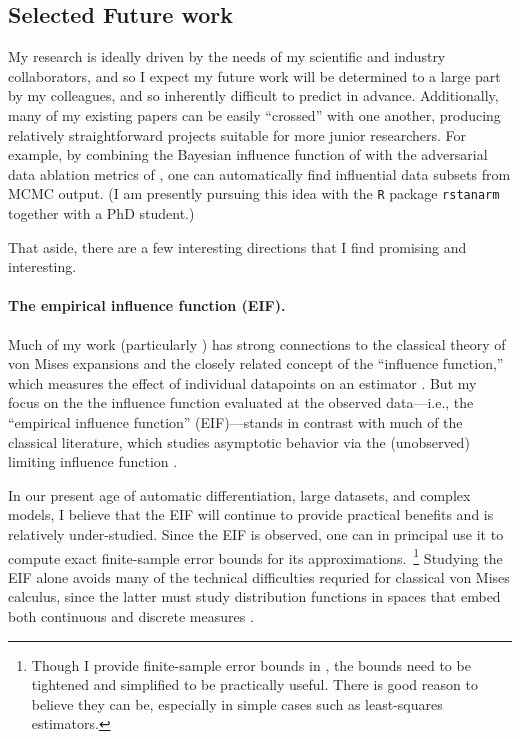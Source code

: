 
\clearpage
\subsection*{Selected Future work}

My research is ideally driven by the needs of my scientific and industry
collaborators, and so I expect my future work will be determined to a large part
by my colleagues, and so inherently difficult to predict in advance.
Additionally, many of my existing papers can be easily ``crossed'' with one
another, producing relatively straightforward projects suitable for more junior
researchers.  For example, by combining the Bayesian influence function of
\citet{giordano:2021:bayesij} with the adversarial data ablation metrics of
\citet{giordano:2020:amip}, one can automatically find influential data subsets
from MCMC output.  (I am presently pursuing this idea with the \texttt{R}
package \texttt{rstanarm} together with a PhD student.)

That aside, there are a few interesting directions that I find promising
and interesting.


\paragraph{The empirical influence function (EIF).}

Much of my work (particularly \citet{giordano:2019:ij, giordano:2020:amip,
giordano:2021:bayesij}) has strong connections to the classical theory of von
Mises expansions and the closely related concept of the ``influence function,''
which measures the effect of individual datapoints on an estimator
\citep{mises:1947:asymptotic, reeds:1976:thesis, hampel:1986:robustbook,
serfling:2009:approximation}.  But my focus on the the influence function
evaluated at the observed data---i.e., the ``empirical influence function''
(EIF)---stands in contrast with much of the classical literature, which studies
asymptotic behavior via the (unobserved) limiting influence function .

In our present age of automatic differentiation, large datasets, and complex
models, I believe that the EIF will continue to provide practical benefits and
is relatively under-studied.  Since the EIF is observed, one can in principal
use it to compute exact finite-sample error bounds for its
approximations.~\footnote{Though I provide finite-sample error bounds in
\citet{giordano:2019:ij, giordano:2019:hoij}, the bounds need to be tightened
and simplified to be practically useful.  There is good reason to believe they
can be, especially in simple cases such as least-squares estimators.} Studying
the EIF alone avoids many of the technical difficulties requried for classical
von Mises calculus, since the latter must study distribution functions in spaces
that embed both continuous and discrete measures \citep{gill:1989:mises}.

